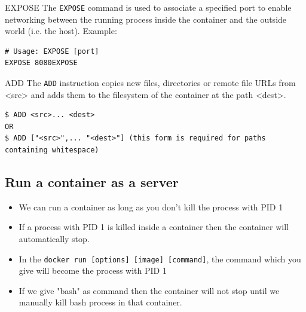 \documentclass[11pt]{article}
\begin{document}
\begin{description}
\item EXPOSE
The \texttt{EXPOSE} command is used to associate a specified port to enable networking
between the running process inside the container and the outside world
(i.e. the host).
Example:
\begin{verbatim}
# Usage: EXPOSE [port]
EXPOSE 8080EXPOSE
\end{verbatim}
\item ADD
The \texttt{ADD} instruction copies new files, directories or remote file URLs
from <src> and adds them to the filesystem of the container at the path
<dest>.
\begin{verbatim}
$ ADD <src>... <dest>
OR   
$ ADD ["<src>",... "<dest>"] (this form is required for paths containing whitespace)
\end{verbatim}
\end{description}

\subsection{Run a container as a server}
\label{sec:orgheadline25}
\begin{itemize}
\item We can run a container as long as you don't kill the process with PID 1
\item If a process with PID 1 is killed inside a container then the container will
automatically stop.
\item In the \texttt{docker run [options] [image] [command]}, the command which you give
will become the process with PID 1
\item If we give "bash" as command then the container will not stop until we
manually kill bash process in that container.
\end{itemize}
\end{document}
